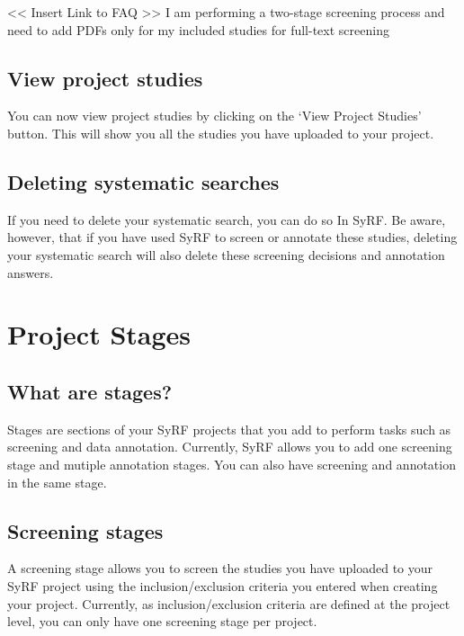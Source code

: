 \documentclass[
]{book}
\begin{document}
\textless{}\textless{} Insert Link to FAQ \textgreater{}\textgreater{}
I am performing a two-stage screening process and need to add PDFs only for my included studies for full-text screening

\hypertarget{view-project-studies}{%
\section{View project studies}\label{view-project-studies}}

You can now view project studies by clicking on the `View Project Studies' button. This will show you all the studies you have uploaded to your project.

\hypertarget{deleting-systematic-searches}{%
\section{Deleting systematic searches}\label{deleting-systematic-searches}}

If you need to delete your systematic search, you can do so In SyRF. Be aware, however, that if you have used SyRF to screen or annotate these studies, deleting your systematic search will also delete these screening decisions and annotation answers.

\hypertarget{stages}{%
\chapter{Project Stages}\label{stages}}

\hypertarget{what-are-stages}{%
\section{What are stages?}\label{what-are-stages}}

Stages are sections of your SyRF projects that you add to perform tasks such as screening and data annotation. Currently, SyRF allows you to add one screening stage and mutiple annotation stages. You can also have screening and annotation in the same stage.

\hypertarget{screening-stages}{%
\section{Screening stages}\label{screening-stages}}

A screening stage allows you to screen the studies you have uploaded to your SyRF project using the inclusion/exclusion criteria you entered when creating your project. Currently, as inclusion/exclusion criteria are defined at the project level, you can only have one screening stage per project.
\end{document}
